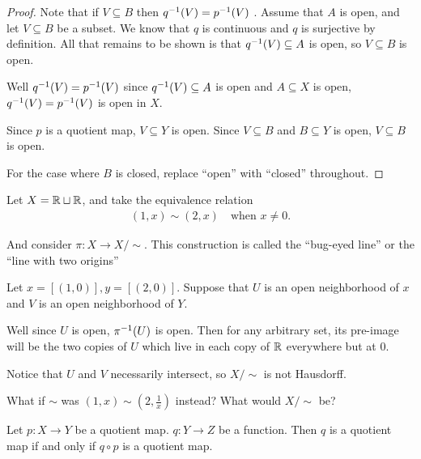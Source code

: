 \documentclass[12pt, twosided]{article}
\begin{document}
\begin{proof}
  Note that if \(V \subseteq B\) then \(q^{-1}(V) = p^{-1}(V)\) . Assume that \(A\) is open, and let \(V \subseteq B\) be a subset. We know that \(q\) is continuous and \(q\) is surjective by definition. All that remains to be shown is that \(q^{-1}(V) \subseteq A\) is open, so \(V \subseteq B\) is open.

  Well \(q^{-1}(V) = p^{-1}(V)\) since \(q^{-1}(V) \subseteq A\) is open and \(A \subseteq X\) is open, \(q^{-1}(V) = p^{-1}(V)\) is open in \(X\).

  Since \(p\) is a quotient map, \(V \subseteq Y\) is open. Since \(V \subseteq B\) and \(B \subseteq Y\) is open, \(V \subseteq B\) is open.

  For the case where \(B\) is closed, replace ``open'' with ``closed'' throughout.
\end{proof}

\begin{exa}
  Let \(X = \mathbb{R} \sqcup \mathbb{R}\), and take the equivalence relation
  \begin{align*}
    (1, x) \sim (2, x) \quad \text{when } x \neq 0.
  \end{align*}

  And consider \(\pi: X \to X/\sim\). This construction is called the ``bug-eyed line'' or the ``line with two origins''

  Let \(x = [(1, 0)], y = [(2,0)]\). Suppose that \(U\)  is an open neighborhood of \(x\) and \(V\) is an open neighborhood of \(Y\).

  Well since \(U\) is open, \(\pi^{-1}(U)\) is open. Then for any arbitrary set, its pre-image will be the two copies of \(U\) which live in each copy of \(\mathbb{R}\) everywhere but at \(0\).

  Notice that \(U\) and \(V\) necessarily intersect, so \(X/ \sim\) is not Hausdorff.
\end{exa}

\begin{ques}
  What if \(\sim\) was \((1,x) \sim \left(2, \frac{1}{x}\right)\) instead? What would \(X/ \sim\) be?
\end{ques}

\begin{lm}
  Let \(p: X \to Y\) be a quotient map. \(q: Y \to Z\) be a function. Then \(q\) is a quotient map if and only if \(q \circ p\) is a quotient map.
\end{lm}
\end{document}
